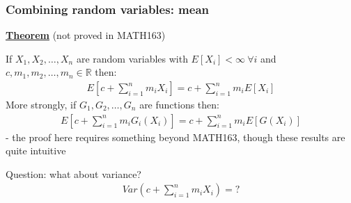 \documentclass[t,8pt]{beamer}%
\begin{document}

\begin{frame}
    \frametitle{Combining random variables: mean}
    {\bf\underline{Theorem}} (not proved in MATH163) \par
    If $X_1,X_2,\dots,X_n$ are random variables with $E[X_i]<\infty\ \forall i$ and $c,m_1,m_2,\dots,m_n\in\mathbb R$ then:
    \begin{eqnarray*}
        E\left[c+\sum_{i=1}^nm_iX_i\right]=c+\sum_{i=1}^nm_iE[X_i]
    \end{eqnarray*}
    More strongly, if $G_1,G_2,\dots,G_n$ are functions then:
    \begin{eqnarray*}
        E\left[c+\sum_{i=1}^nm_iG_i(X_i)\right]=c+\sum_{i=1}^nm_iE[G(X_i)]
    \end{eqnarray*}
    {\small\color{NavyBlue} - the proof here requires something beyond MATH163, though these results are quite intuitive} \par
    Question: what about variance?
    \begin{eqnarray*}
        Var\left(c+\sum_{i=1}^nm_iX_i\right)=?
    \end{eqnarray*}
\end{frame}
\end{document}
